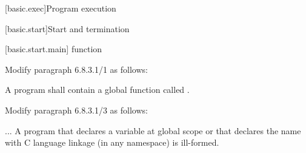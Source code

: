 \setcounter{section}{7}
[basic.exec]{Program execution}

\setcounter{subsection}{2}
[basic.start]{Start and termination}

\setcounter{subsubsection}{0}
[basic.start.main]{ function}

Modify paragraph 6.8.3.1/1 as follows:
\begin{std.txt}
  \pnum[1]
  A program shall contain a global function called 
  .
\end{std.txt}

Modify paragraph 6.8.3.1/3 as follows:
\begin{std.txt}
  \pnum[3]
  ...
  A program that declares a variable  at global scope
  or that declares the name  with C language linkage (in any namespace)
  is ill-formed.
\end{std.txt}
